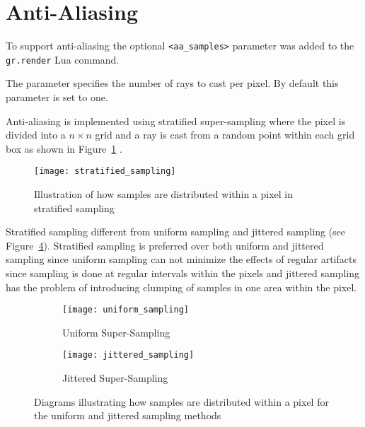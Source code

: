 \section{Anti-Aliasing}

To support anti-aliasing the optional \verb|<aa_samples>| parameter was added to
the \verb|gr.render| Lua command.

The parameter specifies the number of rays to cast per pixel. By default this
parameter is set to one.

Anti-aliasing is implemented using stratified super-sampling where the pixel is
divided into a $n\times n$ grid and a ray is cast from a random point within 
each grid box as shown in Figure~\ref{fig:image1}
\cite{12_shirley_marschner_2009}.

\begin{figure}[ht]
  \texttt{[image: stratified\_sampling]}
  \caption{Illustration of how samples are distributed within a pixel in 
  stratified sampling}
  \label{fig:image1}
\end{figure}

Stratified sampling different from uniform sampling and jittered 
sampling (see Figure~\ref{fig:image2}). Stratified sampling is preferred over 
both uniform and jittered sampling since uniform sampling can not minimize the 
effects of regular artifacts since sampling is done at regular intervals within 
the pixels and jittered sampling has the problem of introducing clumping of 
samples in one area within the pixel.

\begin{figure}[ht]
\begin{subfigure}{0.5\textwidth}
  \texttt{[image: uniform\_sampling]}
  \caption{Uniform Super-Sampling}
  \label{fig:subim1}
\end{subfigure}
\begin{subfigure}{0.5\textwidth}
  \texttt{[image: jittered\_sampling]}
  \caption{Jittered Super-Sampling}
  \label{fig:subim2}
\end{subfigure}
\caption{Diagrams illustrating how samples are distributed within a pixel for
the uniform and jittered sampling methods}
\label{fig:image2}
\end{figure}

